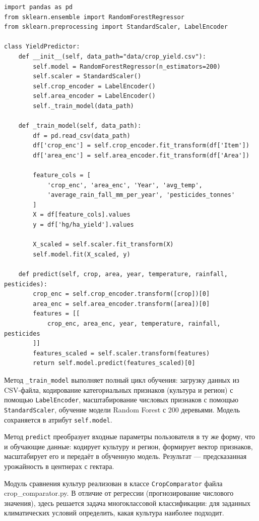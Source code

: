 \documentclass[14pt, a4paper]{extarticle}
\begin{document}
\begin{verbatim}
import pandas as pd
from sklearn.ensemble import RandomForestRegressor
from sklearn.preprocessing import StandardScaler, LabelEncoder

class YieldPredictor:
    def __init__(self, data_path="data/crop_yield.csv"):
        self.model = RandomForestRegressor(n_estimators=200)
        self.scaler = StandardScaler()
        self.crop_encoder = LabelEncoder()
        self.area_encoder = LabelEncoder()
        self._train_model(data_path)
    
    def _train_model(self, data_path):
        df = pd.read_csv(data_path)
        df['crop_enc'] = self.crop_encoder.fit_transform(df['Item'])
        df['area_enc'] = self.area_encoder.fit_transform(df['Area'])
        
        feature_cols = [
            'crop_enc', 'area_enc', 'Year', 'avg_temp',
            'average_rain_fall_mm_per_year', 'pesticides_tonnes'
        ]
        X = df[feature_cols].values
        y = df['hg/ha_yield'].values
        
        X_scaled = self.scaler.fit_transform(X)
        self.model.fit(X_scaled, y)
    
    def predict(self, crop, area, year, temperature, rainfall, pesticides):
        crop_enc = self.crop_encoder.transform([crop])[0]
        area_enc = self.area_encoder.transform([area])[0]
        features = [[
            crop_enc, area_enc, year, temperature, rainfall, pesticides
        ]]
        features_scaled = self.scaler.transform(features)
        return self.model.predict(features_scaled)[0]
\end{verbatim}

    Метод \texttt{\_train\_model} выполняет полный цикл обучения: загрузку данных из CSV-файла, кодирование категориальных признаков (культура и регион) с помощью \texttt{LabelEncoder}, масштабирование числовых признаков с помощью \texttt{StandardScaler}, обучение модели Random Forest с 200 деревьями. Модель сохраняется в атрибут \texttt{self.model}.

    Метод \texttt{predict} преобразует входные параметры пользователя в ту же форму, что и обучающие данные: кодирует культуру и регион, формирует вектор признаков, масштабирует его и передаёт в обученную модель. Результат — предсказанная урожайность в центнерах с гектара.

    Модуль сравнения культур реализован в классе \texttt{CropComparator} файла crop\_comparator.py. В отличие от регрессии (прогнозирование числового значения), здесь решается задача многоклассовой классификации: для заданных климатических условий определить, какая культура наиболее подходит.
\end{document}
